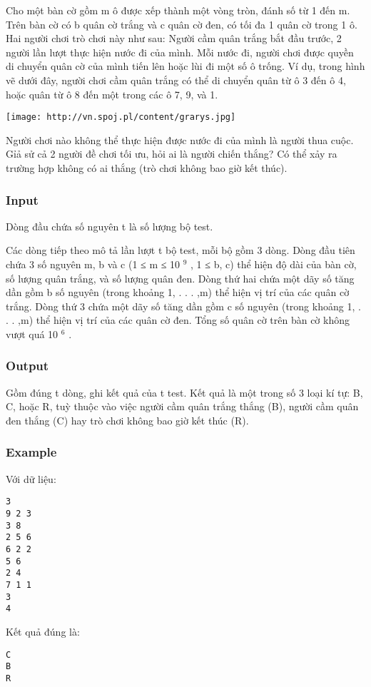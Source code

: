 







   Cho một bàn cờ gồm m ô được xếp thành một vòng tròn, đánh số từ 1 đến m. Trên bàn cờ có b quân cờ trắng và c quân cờ đen, có tối đa 1 quân cờ trong 1 ô. Hai người chơi trò chơi này như sau: Người cầm quân trắng bắt đầu trước, 2 người lần lượt thực hiện nước đi của mình. Mỗi nước đi, người chơi được quyền di chuyển quân cờ của mình tiến lên hoặc lùi đi một số ô trống. Ví dụ, trong hình vẽ dưới đây, người chơi cầm quân trắng có thể di chuyển quân từ ô 3 đến ô 4, hoặc quân từ ô 8 đến một trong các ô 7, 9, và 1.  


\texttt{[image: http://vn.spoj.pl/content/grarys.jpg]}

   Người chơi nào không thể thực hiện được nước đi của mình là người thua cuộc. Gỉả sử cả 2 người đề chơi tối ưu, hỏi ai là người chiến thắng? Có thể xảy ra trường hợp không có ai thắng (trò chơi không bao giờ kết thúc).  

\subsubsection{   Input  }

   Dòng đầu chứa số nguyên t là số lượng bộ test.  

   Các dòng tiếp theo mô tả lần lượt t bộ test, mỗi bộ gồm 3 dòng. Dòng đầu tiên chứa 3 số nguyên m, b và c (1 ≤ m ≤ 10   $^    9   $   , 1 ≤ b, c) thể hiện độ dài của bàn cờ, số lượng quân trắng, và số lượng quân đen. Dòng thứ hai chứa một dãy số tăng dần gồm b số nguyên (trong khoảng 1, . . . ,m) thể hiện vị trí của các quân cờ trắng. Dòng thứ 3 chứa một dãy số tăng dần gồm c số nguyên (trong khoảng 1, . . . ,m) thể hiện vị trí của các quân cờ đen. Tổng số quân cờ trên bàn cờ không vượt quá 10   $^    6   $   .  

\subsubsection{   Output  }

   Gồm đúng t dòng, ghi kết quả của t test. Kết quả là một trong số 3 loại kí tự: B, C, hoặc R, tuỳ thuộc vào việc người cầm quân trắng thắng (B), người cầm quân đen thắng (C) hay trò chơi không bao giờ kết thúc (R).  

\subsubsection{   Example  }

   Với dữ liệu:  
\begin{verbatim}
3
9 2 3
3 8
2 5 6
6 2 2
5 6
2 4
7 1 1
3
4
\end{verbatim}

   Kết quả đúng là:  
\begin{verbatim}
C
B
R
\end{verbatim}

